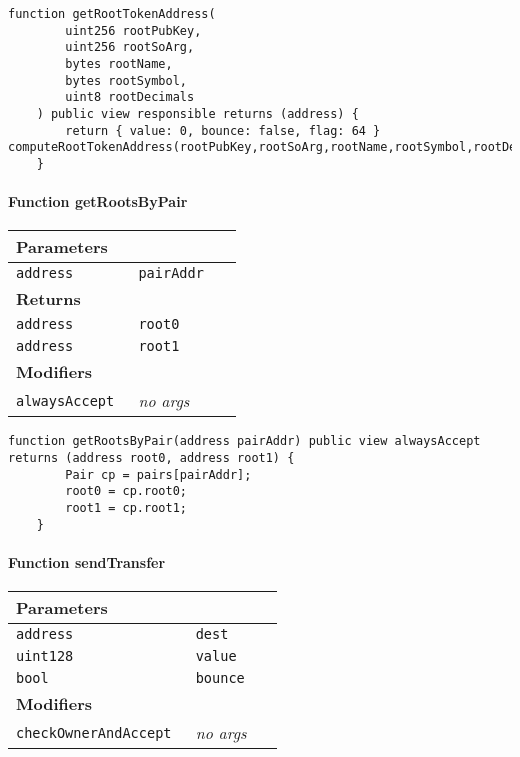 \vspace{2cm}

\begin{lstlisting}[firstnumber=213]
	function getRootTokenAddress(
		uint256 rootPubKey,
		uint256 rootSoArg,
		bytes rootName,
		bytes rootSymbol,
		uint8 rootDecimals
	) public view responsible returns (address) {
		return { value: 0, bounce: false, flag: 64 } computeRootTokenAddress(rootPubKey,rootSoArg,rootName,rootSymbol,rootDecimals);
	}
\end{lstlisting}

\paragraph{Function getRootsByPair}


\ifsoltables
\noindent\begin{tabular}{|l|l|p{5cm}|}\hline
\multicolumn{3}{|l|}{\bf Parameters}\\\hline
\tt address & \tt pairAddr &\\\hline
\multicolumn{3}{|l|}{\bf Returns}\\\hline
\tt address & \tt root0 &\\\hline
\tt address & \tt root1 &\\\hline
\multicolumn{3}{|l|}{\bf Modifiers}\\\hline
\tt alwaysAccept & {\em no args} &\\\hline
\end{tabular}
\fi

\vspace{2cm}

\begin{lstlisting}[firstnumber=322]
	function getRootsByPair(address pairAddr) public view alwaysAccept returns (address root0, address root1) {
		Pair cp = pairs[pairAddr];
		root0 = cp.root0;
		root1 = cp.root1;
	}
\end{lstlisting}

\paragraph{Function sendTransfer}


\ifsoltables
\noindent\begin{tabular}{|l|l|p{5cm}|}\hline
\multicolumn{3}{|l|}{\bf Parameters}\\\hline
\tt address & \tt dest &\\\hline
\tt uint128 & \tt value &\\\hline
\tt bool & \tt bounce &\\\hline
\multicolumn{3}{|l|}{\bf Modifiers}\\\hline
\tt checkOwnerAndAccept & {\em no args} &\\\hline
\end{tabular}
\fi

